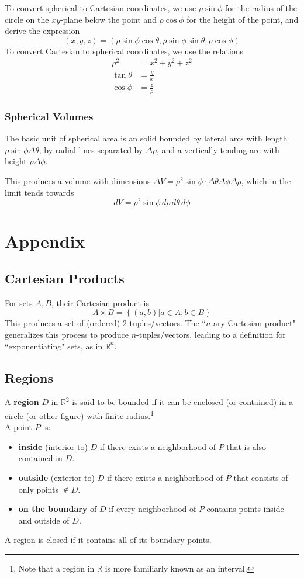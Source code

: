 \documentclass{article}
\begin{document}
To convert spherical to Cartesian coordinates, we use $\rho\sin\phi$ for the radius of the circle on the $xy$-plane below the point and $\rho\cos\phi$ for the height of the point, and derive the expression
$$(x,y,z)=(\rho\sin\phi\cos\theta,\rho\sin\phi\sin\theta,\rho\cos\phi)$$
To convert Cartesian to spherical coordinates, we use the relations
\begin{align*}
    \rho^2&=x^2+y^2+z^2\\
    \tan\theta&=\frac{y}{x}\\
    \cos\phi&=\frac{z}{\rho}
\end{align*}

\subsubsection{Spherical Volumes}
The basic unit of spherical area is an solid bounded by lateral arcs with length $\rho\sin\phi\Delta\theta$, by radial lines separated by $\Delta\rho$, and a vertically-tending arc with height $\rho\Delta\phi$.

This produces a volume with dimensions $\Delta{V}=\rho^2\sin\phi\cdot\Delta\theta\Delta\phi\Delta\rho$, which in the limit tends towards
$$dV=\rho^2\sin\phi\,d\rho\,d\theta\,d\phi$$

\section{Appendix}
\subsection{Cartesian Products} \label{set-multiplication}
For sets $A, B$, their Cartesian product is $$A \times B = \left\{ (a,b) | a \in A, b \in B\right\}$$
This produces a set of (ordered) 2-tuples/vectors.
The ``$n$-ary Cartesian product" generalizes this process to produce $n$-tuples/vectors, leading to a definition for ``exponentiating" sets, as in $\mathbb{R}^n$.

\subsection{Regions} \label{regions}
A \textbf{region} $D$ in $\mathbb{R}^2$ is said to be bounded if it can be enclosed (or contained) in a circle (or other figure) with finite radius.\footnote{Note that a region in $\mathbb{R}$ is more familiarly known as an interval.}\\
A point $P$ is:
\begin{itemize}
    \item \textbf{inside} (interior to) $D$ if there exists a neighborhood of $P$ that is also contained in $D$.
    \item \textbf{outside} (exterior to) $D$ if there exists a neighborhood of $P$ that consists of only points $\notin D$.
    \item \textbf{on the boundary} of $D$ if every neighborhood of $P$ contains points inside and outside of $D$.
\end{itemize}
A region is closed if it contains all of its boundary points.
\end{document}
